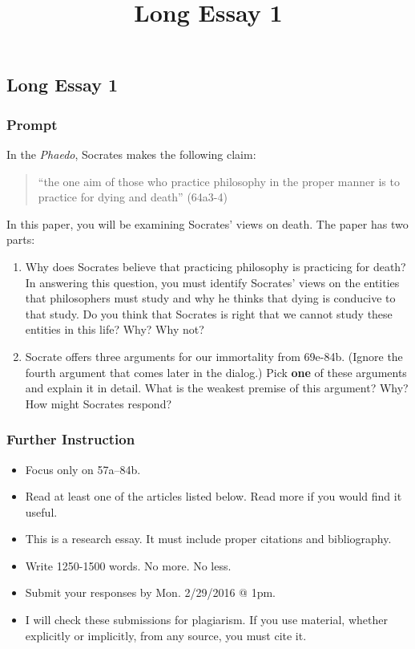 \documentclass[]{article}
\title{Long Essay 1}
\date{}
\begin{document}
\maketitle

\subsection{Long Essay 1}\label{long-essay-1}

\subsubsection{Prompt}\label{prompt}

In the \emph{Phaedo}, Socrates makes the following claim:

\begin{quote}
``the one aim of those who practice philosophy in the proper manner is
to practice for dying and death'' (64a3-4)
\end{quote}

In this paper, you will be examining Socrates' views on death. The paper
has two parts:

\begin{enumerate}
\def\labelenumi{\arabic{enumi}.}
\item
  Why does Socrates believe that practicing philosophy is practicing for
  death? In answering this question, you must identify Socrates' views
  on the entities that philosophers must study and why he thinks that
  dying is conducive to that study. Do you think that Socrates is right
  that we cannot study these entities in this life? Why? Why not?
\item
  Socrate offers three arguments for our immortality from 69e-84b.
  (Ignore the fourth argument that comes later in the dialog.) Pick
  \textbf{one} of these arguments and explain it in detail. What is the
  weakest premise of this argument? Why? How might Socrates respond?
\end{enumerate}

\subsubsection{Further Instruction}\label{further-instruction}

\begin{itemize}
\itemsep1pt\parskip0pt
\item
  Focus only on 57a--84b.
\item
  Read at least one of the articles listed below. Read more if you would
  find it useful.
\item
  This is a research essay. It must include proper citations and
  bibliography.
\item
  Write 1250-1500 words. No more. No less.
\item
  Submit your responses by Mon. 2/29/2016 @ 1pm.
\item
  I will check these submissions for plagiarism. If you use material,
  whether explicitly or implicitly, from any source, you must cite it.
\end{itemize}
\end{document}
